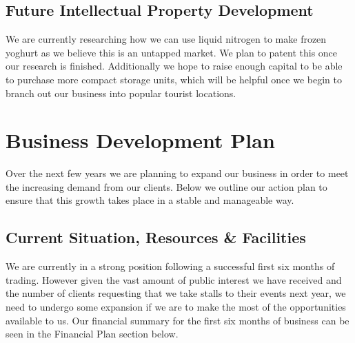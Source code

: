 \documentclass{article}
\begin{document}
  \subsection{Future Intellectual Property Development}

  We are currently researching how we can use liquid nitrogen to make frozen yoghurt as we believe this is an untapped market. We plan to patent this once our research is finished. Additionally we hope to raise enough capital to be able to purchase more compact storage units, which will be helpful once we begin to branch out our business into popular tourist locations.


\section{Business Development Plan}

  Over the next few years we are planning to expand our business in order to meet the increasing demand from our clients. Below we outline our action plan to ensure that this growth takes place in a stable and manageable way.

  \subsection{Current Situation, Resources \& Facilities}

  We are currently in a strong position following a successful first six months of trading. However given the vast amount of public interest we have received and the number of clients requesting that we take stalls to their events next year, we need to undergo some expansion if we are to make the most of the opportunities available to us. Our financial summary for the first six months of business can be seen in the Financial Plan section below. \\
\end{document}
